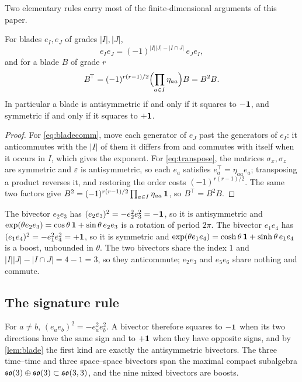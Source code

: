 Two elementary rules carry most of the finite-dimensional arguments of this paper.

\begin{lemma}
\label{lem:blade}
For blades $e_I,e_J$ of grades $|I|,|J|$,
\begin{equation}
\label{eq:bladecomm}
e_Ie_J=(-1)^{|I||J|-|I\cap J|}\,e_Je_I ,
\end{equation}
and for a blade $B$ of grade $r$
\begin{equation}
\label{eq:transpose}
B^{\!\top}=(-1)^{r(r-1)/2}\Bigl(\prod_{a\in I}\eta_{aa}\Bigr)B=B^2B .
\end{equation}
In particular a blade is antisymmetric if and only if it squares to $-\mathbf 1$, and symmetric if and only if it squares to $+\mathbf 1$.
\end{lemma}

\begin{proof}
For \eqref{eq:bladecomm}, move each generator of $e_J$ past the generators of $e_I$: it anticommutes with the $|I|$ of them
it differs from and commutes with itself when it occurs in $I$, which gives the exponent. For \eqref{eq:transpose}, the
matrices $\sigma_x,\sigma_z$ are symmetric and $\varepsilon$ is antisymmetric, so each $e_a$ satisfies $e_a^{\!\top}=\eta_{aa}e_a$;
transposing a product reverses it, and restoring the order costs $(-1)^{r(r-1)/2}$. The same two factors give
$B^2=(-1)^{r(r-1)/2}\prod_{a\in I}\eta_{aa}\,\mathbf 1$, so $B^{\!\top}=B^2B$.
\end{proof}

\begin{example}
\label{ex:blades}
The bivector $e_2e_3$ has $(e_2e_3)^2=-e_2^2e_3^2=-\mathbf 1$, so it is antisymmetric and $\exp(\theta e_2e_3)=\cos\theta\,\mathbf 1+
\sin\theta\,e_2e_3$ is a rotation of period $2\pi$. The bivector $e_1e_4$ has $(e_1e_4)^2=-e_1^2e_4^2=+\mathbf 1$, so it is
symmetric and $\exp(\theta e_1e_4)=\cosh\theta\,\mathbf 1+\sinh\theta\,e_1e_4$ is a boost, unbounded in $\theta$. The two
bivectors share the index $1$ and $|I||J|-|I\cap J|=4-1=3$, so they anticommute; $e_2e_3$ and $e_5e_6$ share nothing and
commute.
\end{example}

\subsection{The signature rule}
\label{sec:sigrule}

\begin{theorem}
\label{thm:sig}
For $a\neq b$, $(e_ae_b)^2=-e_a^2e_b^2$. A bivector therefore squares to $-\mathbf 1$ when its two directions have the same
sign and to $+\mathbf 1$ when they have opposite signs, and by \cref{lem:blade} the first kind are exactly the antisymmetric
bivectors. The three time--time and three space--space bivectors span the maximal compact subalgebra
$\mathfrak{so}(3)\oplus\mathfrak{so}(3)\subset\mathfrak{so}(3,3)$, and the nine mixed bivectors are boosts.
\end{theorem}

